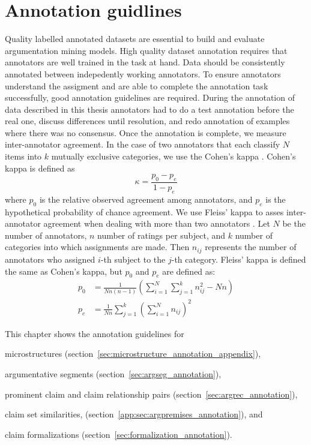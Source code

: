 \chapter{Annotation guidlines}
\label{chap:annotation_guidelines}

Quality labelled annotated datasets are essential to build and evaluate argumentation
mining models.  High quality dataset annotation requires that annotators are
well trained in the task at hand. 
Data should be consistently annotated between indepedently working annotators. 
To ensure annotators understand the assigment and are able to complete 
the annotation task successfully, good annotation guidelines are required. 
During the annotation of data described in this thesis  
annotators had to do a test annotation before the real one, 
discuss differences until resolution, and redo annotation of examples
where there was no consensus. 
Once the annotation is complete, we measure inter-annotator agreement. 
In the case of two annotators that each classify $N$ items into $k$ mutually
exclusive categories, we use the Cohen's kappa \citep{cohen1960coefficient}. 
Cohen's kappa is defined as
$$
\kappa = \frac{p_0 - p_e}{1 - p_e}
$$
where $p_0$ is the relative observed agreement among annotators, and 
$p_e$ is the hypothetical probability of chance agreement. 
We use Fleiss' kappa to asses inter-annotator agreement when dealing with more than
two annotators \citep{fleiss1993review}.
Let $N$ be the number of annotators, $n$ number of ratings per subject, and
$k$ number of categories into which assignments are made. Then $n_{ij}$ represents
the number of annotators who assigned $i$-th subject to the $j$-th category. 
Fleiss' kappa is defined the same as Cohen's kappa, but $p_0$ and $p_e$ are defined as:
\begin{align*}
p_0 &= \frac{1}{Nn(n-1)} \left( \sum_{i=1}^{N} \sum_{j=1}^{k} n_{ij}^2 - Nn \right) \\
p_e &= \frac{1}{Nn} \sum_{j=1}^{k} \left( \sum_{i=1}^{N} n_{ij} \right)^2
\end{align*}

This chapter shows the annotation guidelines for 
\begin{enumerate*}[label=(\arabic*)]
\item microstructures (section~\ref{sec:microstructure_annotation_appendix}), 
\item argumentative segments (section~\ref{sec:argseg_annotation}),
\item prominent claim and claim relationship pairs (section~\ref{sec:argrec_annotation}),
\item claim set similarities, (section~\ref{app:sec:argpremises_annotation}), and
\item claim formalizations (section~\ref{sec:formalization_annotation}).
\end{enumerate*}











